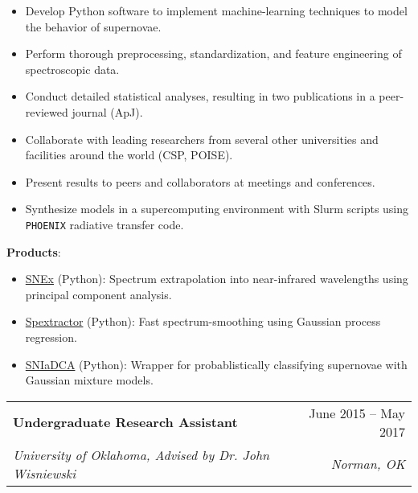 \documentclass[letterpaper,11pt]{article}
\makeatletter
\newcommand{\smallHeading}[1]{\small{\textbf{#1}:\vspace{-5pt}}}
\newcommand{\resumeSubheading}[4]{
  \vspace{-1pt}\item
    \begin{tabular*}{0.97\textwidth}{l@{\extracolsep{\fill}}r}
      \textbf{#1} & #2 \\
      \textit{\small#3} & \textit{\small #4} \\
    \end{tabular*}\vspace{-5pt}
}
\newcommand{\emphasize}[1]{#1}
\makeatother
\begin{document}
    \begin{itemize}\small
      \item \emphasize{Develop Python software} to implement
        \emphasize{machine-learning} techniques to \emphasize{model} the
        behavior of supernovae.
      \item Perform thorough \emphasize{preprocessing},
        \emphasize{standardization}, and \emphasize{feature engineering} of
        spectroscopic data.
      \item Conduct detailed \emphasize{statistical analyses}, resulting in two
        \emphasize{publications} in a peer-reviewed journal (ApJ).
      \item \emphasize{Collaborate} with leading researchers from several other
        universities and facilities around the world (CSP, POISE).
      \item \emphasize{Present} results to peers and collaborators at meetings
        and conferences.
      \item \emphasize{Synthesize models} in a \emphasize{supercomputing}
        environment with \emphasize{Slurm} scripts using \texttt{PHOENIX}
        radiative transfer code.
    \end{itemize}
    \hspace*{1.1em}\smallHeading{Products}
    \begin{itemize}\small
      \item \href{https://github.com/anthonyburrow/SNEx}{SNEx} (Python):
        Spectrum \emphasize{extrapolation} into near-infrared wavelengths using
        \emphasize{principal component analysis}.
      \item \href{https://github.com/anthonyburrow/spextractor}{Spextractor} (Python):
        Fast spectrum-smoothing using \emphasize{Gaussian process regression}.
      \item \href{https://github.com/anthonyburrow/SNIaDCA}{SNIaDCA} (Python):
        Wrapper for probablistically \emphasize{classifying} supernovae with
        \emphasize{Gaussian mixture models}.
    \end{itemize}\vspace{-5pt}

  \normalsize
  \resumeSubheading
    {Undergraduate Research Assistant}{June 2015 -- May 2017}
    {University of Oklahoma, Advised by Dr. John Wisniewski}{Norman, OK}
\end{document}
